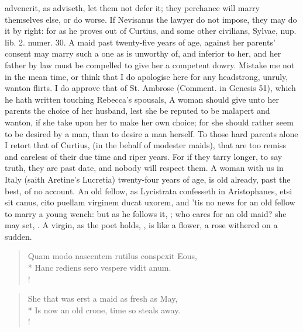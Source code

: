 advenerit, as \Chrysostom{} adviseth, let them not defer it; they
perchance will marry themselves else, or do worse. If Nevisanus the
lawyer do not impose, they may do it by right: for as he proves out of
Curtius, and some other civilians, Sylvae, nup. lib. 2. numer. 30.
A maid past twenty-five years of age, against her parents'
consent may marry such a one as is unworthy of, and inferior to her,
and her father by law must be compelled to give her a competent dowry.
Mistake me not in the mean time, or think that I do apologise here for
any headstrong, unruly, wanton flirts. I do approve that of St. Ambrose
(Comment. in Genesis  51), which he hath written touching
Rebecca's spousals, A woman should give unto her parents the choice of
her husband, lest she be reputed to be malapert and wanton, if
she take upon her to make her own choice; for she should rather
seem to be desired by a man, than to desire a man herself. To those
hard parents alone I retort that of Curtius, (in the behalf of modester
maids), that are too remiss and careless of their due time and riper
years. For if they tarry longer, to say truth, they are past date, and
nobody will respect them. A woman with us in Italy (saith
Aretine's Lucretia) twenty-four years of age, is old already,
past the best, of no account. An old fellow, as Lycistrata confesseth
in Aristophanes, etsi sit canus, cito puellam virginem ducat
uxorem, and 'tis no news for an old fellow to marry a young wench: but
as he follows it, ; who cares
for an old maid? she may set, \etc{}. A virgin, as the poet holds, , is like a flower, a rose withered on a
sudden.

\begin{latin}
\begin{verse}%
Quam modo nascentem rutilus conspexit Eous,\\*
Hanc rediens sero vespere vidit anum.\\!
\end{verse}%
\end{latin}
\translationrule%
\begin{verse}%
She that was erst a maid as fresh as May,\\*
Is now an old crone, time so steals away.\\!
\end{verse}%
%

